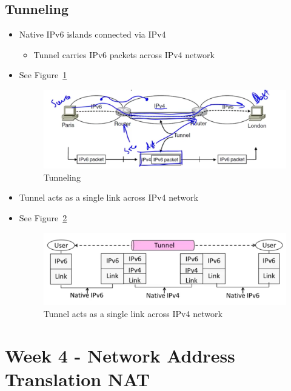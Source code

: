 \documentclass[12pt]{ctexart}   %
\begin{document}
	\subsection{Tunneling}
	\begin{itemize}
		\item Native IPv6 islands connected via IPv4
		\begin{itemize}
			\item Tunnel carries IPv6 packets across IPv4 network
		\end{itemize}
		\item See Figure~\ref{fig:4-9-3}
		
		\begin{figure}[h!] %
		\centering
		 \includegraphics[scale=0.7]{images/4-9-3}
		\caption{ Tunneling }
		 \label{fig:4-9-3}
		 \end{figure}
		 
		 \item Tunnel acts as a single link across IPv4 network
		 \item See Figure~\ref{fig:4-9-4}
		
		\begin{figure}[h!] %
		\centering
		 \includegraphics[scale=0.7]{images/4-9-4}
		\caption{ Tunnel acts as a single link across IPv4 network }
		 \label{fig:4-9-4}
		 \end{figure}
	\end{itemize}
	
\section{Week 4 - Network Address Translation NAT}
\end{document}
